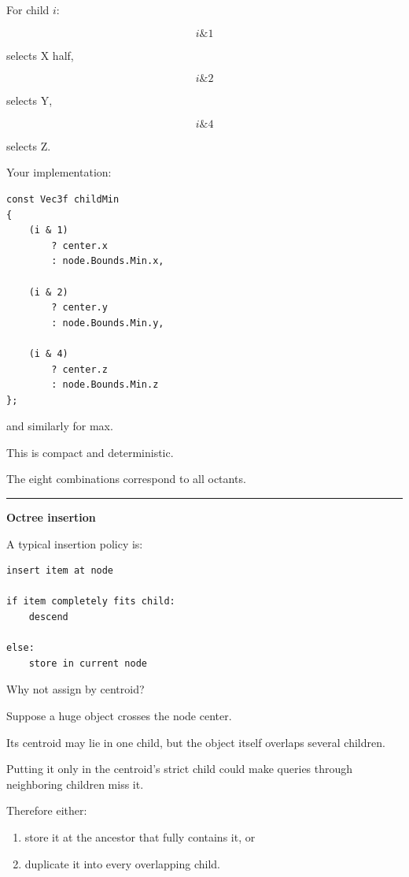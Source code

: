 For child \(i\):

\[
i\&1
\]

selects X half,

\[
i\&2
\]

selects Y,

\[
i\&4
\]

selects Z.

Your implementation:

\begin{verbatim}
const Vec3f childMin
{
    (i & 1)
        ? center.x
        : node.Bounds.Min.x,

    (i & 2)
        ? center.y
        : node.Bounds.Min.y,

    (i & 4)
        ? center.z
        : node.Bounds.Min.z
};
\end{verbatim}

and similarly for max.

This is compact and deterministic.

The eight combinations correspond to all octants.

\begin{center}\rule{0.5\linewidth}{0.5pt}\end{center}

\textbf{Octree insertion}

A typical insertion policy is:

\begin{verbatim}
insert item at node

if item completely fits child:
    descend

else:
    store in current node
\end{verbatim}

Why not assign by centroid?

Suppose a huge object crosses the node center.

Its centroid may lie in one child, but the object itself overlaps several children.

Putting it only in the centroid's strict child could make queries through neighboring children miss it.

Therefore either:

\begin{enumerate}
\def\labelenumi{\arabic{enumi}.}
\tightlist
\item
  store it at the ancestor that fully contains it, or
\item
  duplicate it into every overlapping child.
\end{enumerate}

